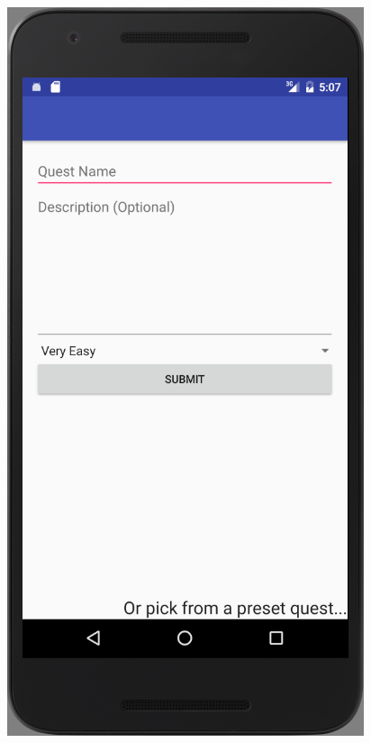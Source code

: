\begin{figure}[ht]
\begin{minipage}[b]{0.25\linewidth}
    \includegraphics[width=.8\linewidth, frame]{../images/Screenshot/AddQuestScreen.png}
    \vspace{2ex}
  \end{minipage}%
  \begin{minipage}[b]{0.25\linewidth}
    \centering

\end{minipage}
\end{figure}
